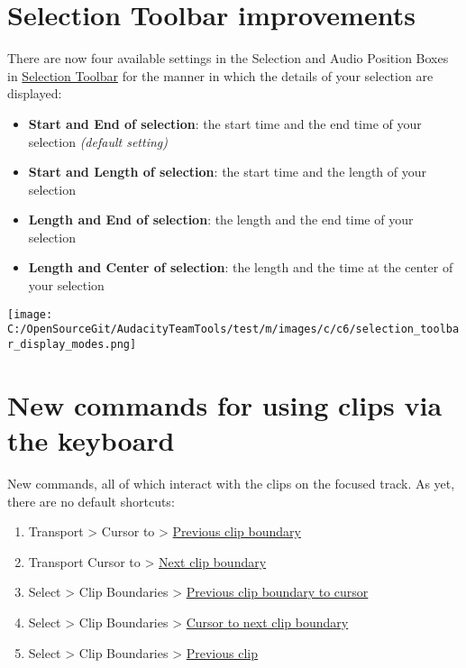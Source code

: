 \begin{multicols}{2}
\section{Selection Toolbar improvements}There are now four available settings in the Selection and Audio Position Boxes in 
\hyperref[selection_toolbar_]{Selection Toolbar}
 for the  manner in which the details of your selection are displayed:

\begin{itemize}
\item \textbf{Start and End of selection}: the start time and the end time of your selection \textit{(default setting)}
\item \textbf{Start and Length of selection}: the start time and the length of your selection
\item \textbf{Length and End of selection}: the length and the end time of your selection
\item \textbf{Length and Center of selection}: the length and the time at the center of your selection
\end{itemize}
\par \texttt{[image: C:/OpenSourceGit/AudacityTeamTools/test/m/images/c/c6/selection\_toolbar\_display\_modes.png]}\par 
\section{New commands for using clips via the keyboard}New commands, all of which interact with the clips on the focused track. As yet, there are no default shortcuts:

\begin{enumerate}
\item Transport > Cursor to > 
\hyperref[transport_menu_cursor_to__previous_clip_boundary]{Previous clip boundary}

\item Transport Cursor to > 
\hyperref[transport_menu_cursor_to__next_clip_boundary]{Next clip boundary}

\item Select > Clip Boundaries > 
\hyperref[select_menu_clip_boundaries__previous_clip_boundary_to_cursor]{Previous clip boundary to cursor}

\item Select > Clip Boundaries > 
\hyperref[select_menu_clip_boundaries__cursor_to_next_clip_boundary]{Cursor to next clip boundary}

\item Select > Clip Boundaries > 
\hyperref[select_menu_clip_boundaries__previous_clip]{Previous clip}


\end{enumerate}
\end{multicols}
